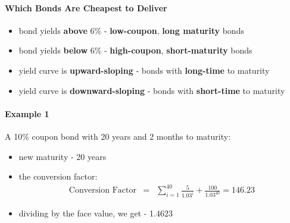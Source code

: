\paragraph{Which Bonds Are Cheapest to Deliver}
\begin{itemize}
	\item bond yields \textbf{above} 6\% - \textbf{\color{blue}low-coupon}, \textbf{\color{ForestGreen}long maturity} bonds
	\item bond yields \textbf{below} 6\% - \textbf{\color{blue}high-coupon}, \textbf{\color{ForestGreen}short-maturity} bonds
	\item yield curve is \textbf{upward-sloping} - bonds with \textbf{\color{blue}long-time} to maturity
	\item yield curve is \textbf{downward-sloping} - bonds with \textbf{\color{blue}short-time} to maturity
\end{itemize}

\paragraph{Example 1}
A 10\% coupon bond with 20 years and 2 months to maturity:\\
\begin{itemize}
	\item new maturity - 20 years
	\item the conversion factor:
	\begin{eqnarray}
	\text{Conversion Factor} &=& \sum_{i = 1}^{40}\frac{5}{1.03^{i}} + \frac{100}{1.03^{40}} = 146.23
	\end{eqnarray}
	\item dividing by the face value, we get - 1.4623
\end{itemize}

